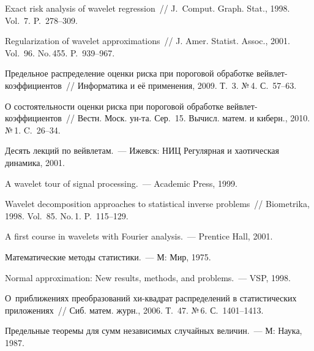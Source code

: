\begin{multicols}{2}
{{\begin{thebibliography}{99}
Exact risk analysis of wavelet regression~// J.~Comput. Graph. Stat., 1998. Vol.~7. P.~278--309.

Regularization of wavelet approximations~// J. Amer. Statist. Assoc., 2001. Vol.~96. No.\,455. P.~939--967.

Предельное распределение оценки риска при пороговой обработке вейвлет-коэффициентов~// 
Информатика и её применения, 2009. Т.~3. №\,4. С.~57--63.

О состоятельности оценки риска при пороговой обработке вейвлет-ко\-эф\-фи\-ци\-ен\-тов~// 
Вестн. Моск. ун-та. Сер.~15. Вычисл. матем. и киберн., 2010. №\,1. C.~26--34.


 Десять лекций по вейвлетам.~--- Ижевск: НИЦ Регулярная и хаотическая динамика, 2001.

A wavelet tour of signal processing.~--- Academic Press, 1999.

Wavelet decomposition approaches to statistical inverse problems~// Biometrika, 1998. Vol.~85. No.\,1. P.~115--129.

A first course in wavelets with Fourier analysis.~--- Prentice Hall, 2001.

 Математические методы статистики.~--- М: Мир, 1975.

 Normal approximation: New results, methods, and problems.~--- VSP, 1998.

О~приближениях преобразований хи-квадрат распределений в статистических приложениях~// Сиб. матем. журн., 2006. 
Т.~47. №\,6. С.~1401--1413.

 \label{end\stat}

 Предельные теоремы для сумм независимых случайных величин.~--- М: Наука, 1987.
 \end{thebibliography}
}
}


\end{multicols}
